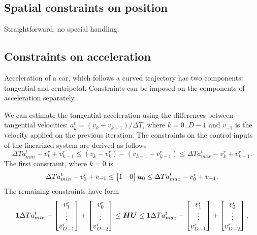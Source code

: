 \documentclass[12pt,a4paper]{article}
\newcommand{\mbm}[1]{\mbox{\boldmath $#1$}}
\begin{document}
\subsection{Spatial constraints on position}
Straightforward, no special handling.


\subsection{Constraints on acceleration}
Acceleration of a car, which follows a curved trajectory has two components: tangential
and centripetal. Constraints can be imposed on the components of acceleration 
separately. 

We can estimate the tangential acceleration using the differences between tangential 
velocities: $a_k^t = (v_k - v_{k-1})/\Delta T$, where $k=0..D-1$ and $v_{-1}$ is the 
velocity applied on the previous iteration. The constraints on the control inputs of
the linearized system are derived as follows
\begin{equation}
\Delta T a^t_{min} - v_k^r + v_{k-1}^r 
\le 
(v_k - v_k^r) - (v_{k-1} - v_{k-1}^r)
\le
\Delta T a^t_{max} - v_k^r + v_{k-1}^r.
\end{equation}
The first constraint, where $k=0$ is
\begin{equation}
\Delta T a^t_{min} - v_0^r + v_{-1}
\le 
\begin{bmatrix} 1 & 0 \end{bmatrix} \mbm{u}_0
\le
\Delta T a^t_{max} - v_0^r + v_{-1}.
\end{equation}
The remaining constraints have form
\begin{equation}
\mbm{1} \Delta T a^t_{min} 
    - \begin{bmatrix} v_1^r \\ \vdots \\ v_{D-1}^r \end{bmatrix}
    + \begin{bmatrix} v_0^r \\ \vdots \\ v_{D-2}^r \end{bmatrix}
\le 
\mbm{H}\mbm{U}
\le
\mbm{1}\Delta T a^t_{max}
    - \begin{bmatrix} v_1^r \\ \vdots \\ v_{D-1}^r \end{bmatrix}
    + \begin{bmatrix} v_0^r \\ \vdots \\ v_{D-2}^r \end{bmatrix},
\end{equation}
\end{document}
